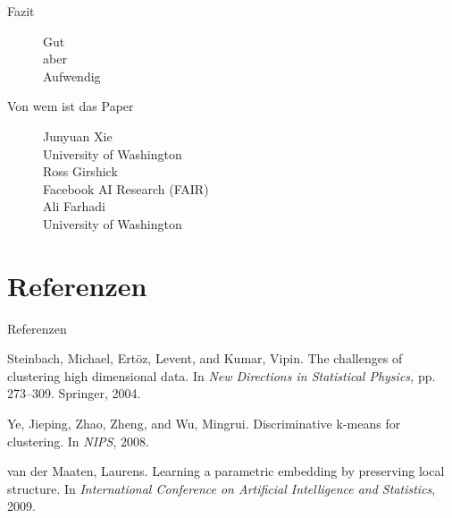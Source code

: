 \documentclass{beamer}
\begin{document}
\begin{frame}[t]{Fazit}\vspace{30pt}
\begin{figure}
\center
\Huge 
Gut\\
aber\\
Aufwendig\\
\end{figure}
\end{frame}

\begin{frame}[t]{Von wem ist das Paper}\vspace{30pt}
\begin{figure}
\center
\Large{Junyuan Xie}\\
University of Washington\\
\vspace{8pt}
\Large{Ross Girshick}\\
Facebook AI Research (FAIR)\\
\vspace{8pt}
\Large{Ali Farhadi}\\
University of Washington\\
\end{figure}
\end{frame}


\section{Referenzen}
\begin{frame}[t]{Referenzen}\vspace{4pt}
\begin{thebibliography}{10}
Steinbach, Michael, Ertöz, Levent, and Kumar, Vipin.
The challenges of clustering high dimensional data. In
\textit{New Directions in Statistical Physics,} pp. 273–309. Springer, 2004.

Ye, Jieping, Zhao, Zheng, and Wu, Mingrui. Discriminative k-means for clustering. In \textit{NIPS}, 2008.

van der Maaten, Laurens. Learning a parametric embedding by preserving local structure. In \textit{International Conference on Artificial Intelligence and Statistics}, 2009.
\end{thebibliography}
\end{frame}
\end{document}
